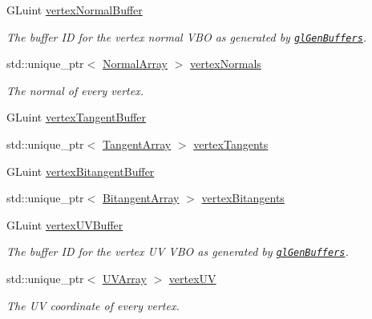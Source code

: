 \begin{DoxyCompactItemize}
G\+Luint \hyperlink{class_rendering_object_a91649e3a653f2266cd00c718f10849f9}{vertex\+Normal\+Buffer}
\begin{DoxyCompactList}\small\item\em The buffer ID for the vertex normal V\+BO as generated by \href{https://www.opengl.org/sdk/docs/man/html/glGenBuffers.xhtml}{\tt gl\+Gen\+Buffers}. \end{DoxyCompactList}\item
std\+::unique\+\_\+ptr$<$ \hyperlink{class_rendering_object_a327c4d892de8d6138fb59afa6d078257}{Normal\+Array} $>$ \hyperlink{class_rendering_object_ac28d301f97d29ab603f65f8e823063b4}{vertex\+Normals}
\begin{DoxyCompactList}\small\item\em The normal of every vertex. \end{DoxyCompactList}\item
G\+Luint \hyperlink{class_rendering_object_a0eac563be6e35a3cc4409d43a2abaa04}{vertex\+Tangent\+Buffer}
\item
std\+::unique\+\_\+ptr$<$ \hyperlink{class_rendering_object_a45b53e911c2f0131aa10e89869d38944}{Tangent\+Array} $>$ \hyperlink{class_rendering_object_a7bca44786929dd3aca3d6ca1acc7597f}{vertex\+Tangents}
\item
G\+Luint \hyperlink{class_rendering_object_a0c2f16211e989dd4d9d2ebbf7c027fb6}{vertex\+Bitangent\+Buffer}
\item
std\+::unique\+\_\+ptr$<$ \hyperlink{class_rendering_object_a6c6bf305a5f0f9ce1006f374c753c856}{Bitangent\+Array} $>$ \hyperlink{class_rendering_object_a3d0ab70c5a87e4cd7fff87f3ee927678}{vertex\+Bitangents}
\item
G\+Luint \hyperlink{class_rendering_object_ad583c70014e3f6ab0c9b62ea3c96ad25}{vertex\+U\+V\+Buffer}
\begin{DoxyCompactList}\small\item\em The buffer ID for the vertex UV V\+BO as generated by \href{https://www.opengl.org/sdk/docs/man/html/glGenBuffers.xhtml}{\tt gl\+Gen\+Buffers}. \end{DoxyCompactList}\item
std\+::unique\+\_\+ptr$<$ \hyperlink{class_rendering_object_a504ecd45ebe36dfa5b78c46d64d9904a}{U\+V\+Array} $>$ \hyperlink{class_rendering_object_afc405316bddec4ba1d5c228ecc0d9061}{vertex\+UV}
\begin{DoxyCompactList}\small\item\em The UV coordinate of every vertex. \end{DoxyCompactList}\item

\end{DoxyCompactItemize}
